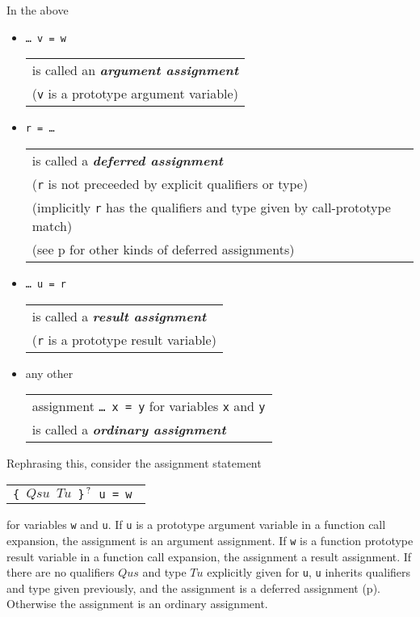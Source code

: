 \documentclass[12pt]{article}
\newcommand{\key}[1]{{\bf \em #1}\index{#1}}
\newcommand{\pagref}[1]{p\pageref{#1}}
\newcommand{\QMARK}{{$^{\,\mbox{\footnotesize ?}}$}}
\newenvironment{indpar}[1][0.3in]%
	{\begin{list}{}%
		     {\setlength{\itemsep}{0in}%
		      \setlength{\topsep}{0in}%
		      \setlength{\parsep}{1ex}%
		      \setlength{\labelwidth}{#1}%
		      \setlength{\leftmargin}{#1}%
		      \addtolength{\leftmargin}{\labelsep}}%
	 \item}%
	{\end{list}}
\begin{document}
In the above
\begin{indpar}
\begin{itemize}
\item {\tt \ldots{}~v = w}
	\begin{tabular}[t]{@{}l}
	is called an \key{argument assignment} \\
        ({\tt v} is a prototype argument variable)
	\end{tabular}
\item {\tt r = \ldots}
	\begin{tabular}[t]{@{}l}
	is called a \key{deferred assignment} \\
	({\tt r} is not preceeded by explicit qualifiers or type) \\
	(implicitly {\tt r} has the qualifiers and type given by
	call-prototype match) \\
        (see \pagref{DEFERRED-ASSIGNMENT} for other kinds of
	deferred assignments) \\
	\end{tabular}
\item {\tt \ldots{}~u = r}
	\begin{tabular}[t]{@{}l}
	is called a \key{result assignment} \\
	({\tt r} is a prototype result variable)
	\end{tabular}
\item any other
	\begin{tabular}[t]{@{}l}
	assignment {\tt \ldots~x = y} for variables {\tt x} and {\tt y} \\
	is called a \key{ordinary assignment}
	\end{tabular}
\end{itemize}
\end{indpar}

Rephrasing this, consider the assignment statement
\begin{center}
\begin{tabular}{l}
\tt \{ $Qsu$ $Tu$ \}\QMARK{} u = w \\
\end{tabular}
\end{center}

for variables {\tt w} and {\tt u}.
If {\tt u} is a prototype argument variable in a function call expansion,
the assignment is an argument assignment.
If {\tt w} is a function prototype result variable in a function call expansion,
the assignment a result assignment.
If there are no qualifiers $Qus$ and type $Tu$ explicitly given for {\tt u},
{\tt u} inherits qualifiers and type given previously, and the assignment
is a deferred assignment (\pagref{DEFERRED-ASSIGNMENT}).
Otherwise the assignment is an ordinary assignment.
\end{document}
